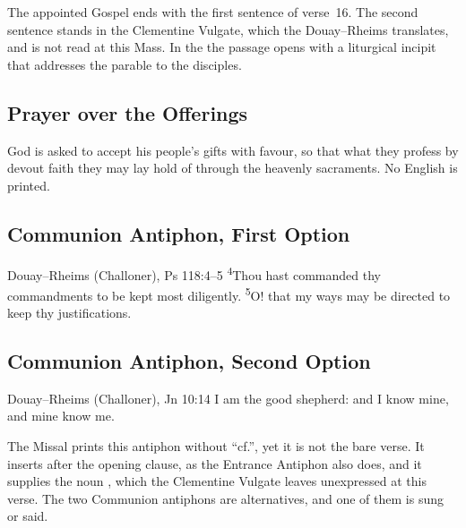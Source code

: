 \noindent The appointed Gospel ends with the first sentence of verse~16. The
second sentence stands in the Clementine Vulgate, which the Douay--Rheims
translates, and is not read at this Mass. In the 
the passage opens with a liturgical incipit that addresses the parable to the
disciples.

\subsection{Prayer over the Offerings}
\label{proper-prayer-over-offerings}


\noindent God is asked to accept his people's gifts with favour, so that what
they profess by devout faith they may lay hold of through the heavenly
sacraments. No English is printed.

\subsection{Communion Antiphon, First Option}
\label{proper-communion-antiphon-a}


\begin{englishwitness}{Douay--Rheims (Challoner), Ps 118:4--5}
\textsuperscript{4}Thou hast commanded thy commandments to be kept most
diligently. \textsuperscript{5}O! that my ways may be directed to keep thy
justifications.
\end{englishwitness}

\subsection{Communion Antiphon, Second Option}
\label{proper-communion-antiphon-b}


\begin{englishwitness}{Douay--Rheims (Challoner), Jn 10:14}
I am the good shepherd: and I know mine, and mine know me.
\end{englishwitness}

\noindent The Missal prints this antiphon without ``cf.'', yet it is not the
bare verse. It inserts  after the opening clause, as the
Entrance Antiphon also does, and it supplies the noun , which the
Clementine Vulgate leaves unexpressed at this verse. The two Communion
antiphons are alternatives, and one of them is sung or said.

